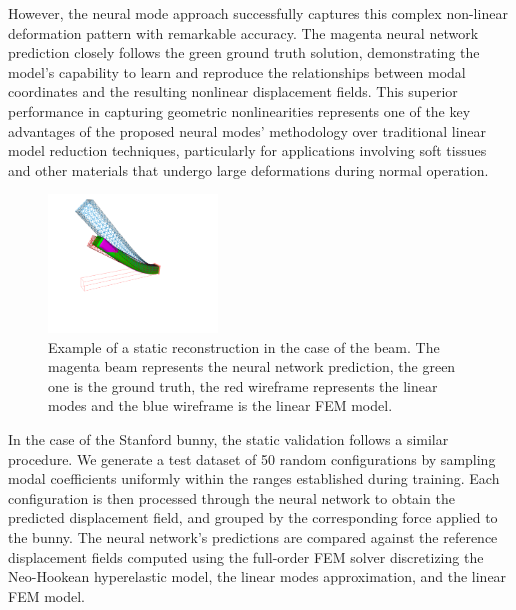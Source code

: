 However, the neural mode approach successfully captures this complex non-linear deformation pattern with remarkable accuracy. The magenta neural network prediction closely follows the green ground truth solution, demonstrating the model's capability to learn and reproduce the relationships between modal coordinates and the resulting nonlinear displacement fields. This superior performance in capturing geometric nonlinearities represents one of the key advantages of the proposed neural modes' methodology over traditional linear model reduction techniques, particularly for applications involving soft tissues and other materials that undergo large deformations during normal operation.

\begin{figure}[H]
    \centering
    \includegraphics[width=0.4\textwidth]{Images/sofa_example_beam.png}
    \caption{Example of a static reconstruction in the case of the beam. The magenta beam represents the neural network prediction, the green one is the ground truth, the red wireframe represents the linear modes and the blue wireframe is the linear FEM model.}
    \label{fig:static_rmse_distribution}
\end{figure}

In the case of the Stanford bunny, the static validation follows a similar procedure. We generate a test dataset of 50 random configurations by sampling modal coefficients uniformly within the ranges established during training. Each configuration is then processed through the neural network to obtain the predicted displacement field, and grouped by the corresponding force applied to the bunny. The neural network's predictions are compared against the reference displacement fields computed using the full-order FEM solver discretizing the Neo-Hookean hyperelastic model, the linear modes approximation, and the linear FEM model.

